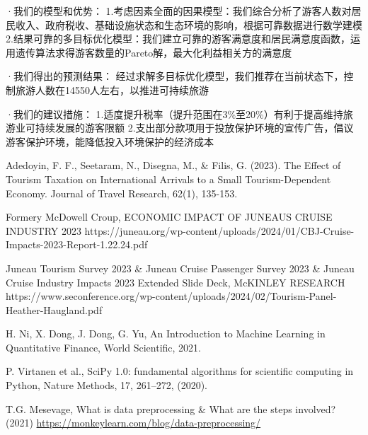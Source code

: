 \documentclass[12pt]{article}  %
\begin{document}
·我们的模型和优势：
1.考虑因素全面的因果模型：我们综合分析了游客人数对居民收入、政府税收、基础设施状态和生态环境的影响，根据可靠数据进行数学建模
2.结果可靠的多目标优化模型：我们建立可靠的游客满意度和居民满意度函数，运用遗传算法求得游客数量的Pareto解，最大化利益相关方的满意度

·我们得出的预测结果：
经过求解多目标优化模型，我们推荐在当前状态下，控制旅游人数在14550人左右，以推进可持续旅游

·我们的建议措施：
1.适度提升税率（提升范围在3\%至20\%）有利于提高维持旅游业可持续发展的游客限额
2.支出部分款项用于投放保护环境的宣传广告，倡议游客保护环境，能降低投入环境保护的经济成本
 \clearpage   %
 
 \begin{thebibliography}{99}
    Adedoyin, F. F., Seetaram, N., Disegna, M., \& Filis, G. (2023). The Effect of Tourism Taxation on International Arrivals to a Small Tourism-Dependent Economy. Journal of Travel Research, 62(1), 135-153. 
     
    Formery McDowell Croup, ECONOMIC IMPACT OF JUNEAU\textquotesingle S CRUISE INDUSTRY 2023
    {https://juneau.org/wp-content/uploads/2024/01/CBJ-Cruise-Impacts-2023-Report-1.22.24.pdf}

    Juneau Tourism Survey 2023 \& Juneau Cruise Passenger Survey 2023 \& Juneau Cruise Industry Impacts 2023 Extended Slide Deck, McKINLEY RESEARCH
    {https://www.seconference.org/wp-content/uploads/2024/02/Tourism-Panel-Heather-Haugland.pdf}

   H. Ni, X. Dong, J. Dong, G. Yu, An Introduction to Machine Learning in Quantitative Finance, World Scientific, 2021.
   
   P. Virtanen et al., SciPy 1.0: fundamental algorithms for scientific computing in
   Python, Nature Methods, 17, 261--272, (2020).
   
   T.G. Mesevage, What is data preprocessing \& What are the steps involved? (2021) \href{https://monkeylearn.com/blog/data-preprocessing/}{https://monkeylearn.com/blog/data-preprocessing/}
 \end{thebibliography}
 
 
 
\end{document}
